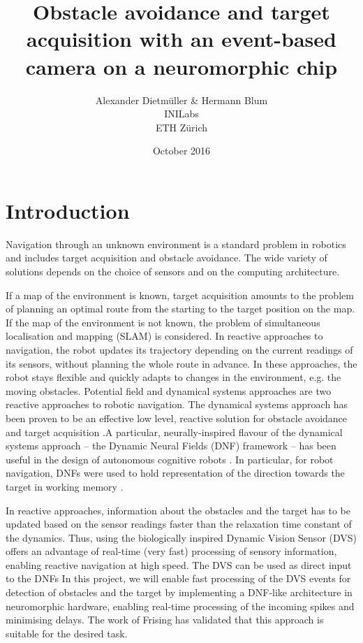 \documentclass[a4paper, twocolumn]{article}
\title{Obstacle avoidance and target acquisition with an event-based camera on a neuromorphic chip}
\author{Alexander Dietmüller \& Hermann Blum \\INILabs\\ETH Zürich}
\date{October 2016}
\begin{document}
\maketitle

\section*{Introduction}
Navigation through an unknown environment is a standard problem in robotics and includes target acquisition and obstacle avoidance. The wide variety of solutions depends on the choice of sensors and on the computing architecture.

If a map of the environment is known, target acquisition amounts to the problem of planning an optimal route from the starting to the target position on the map. If the map of the environment is not known, the problem of simultaneous localisation and mapping (SLAM) is considered.  In reactive approaches to navigation, the robot updates its trajectory depending on the current readings of its sensors, without planning the whole route in advance. In these approaches, the robot stays flexible and quickly adapts to changes in the environment, e.g. the moving obstacles.  Potential field and dynamical systems approaches are two reactive approaches to robotic navigation. The dynamical systems approach has been proven to be an effective low level, reactive solution for obstacle avoidance and target acquisition \cite{bicho1998}.A particular, neurally-inspired flavour of the dynamical systems approach -- the Dynamic Neural Fields (DNF) framework -- has been useful in the design of autonomous cognitive robots \cite{erlhagen2006}. In particular, for robot navigation, DNFs were used to hold representation of the direction towards the target in working memory \cite{bicho2000}.
 
In reactive approaches, information about the obstacles and the target has to be updated based on the sensor readings faster than the relaxation time constant of the dynamics. Thus, using  the biologically inspired Dynamic Vision Sensor (DVS) \cite{lichtsteiner2008} offers an advantage of real-time (very fast) processing of sensory information, enabling reactive navigation at high speed. The DVS can be used as direct input to the DNFs \cite{sandamirskayaconradt2013} In this project, we will enable fast processing of the DVS events for detection of obstacles and the target by implementing a DNF-like architecture in neuromorphic hardware, enabling real-time processing of the incoming spikes and minimising delays. The work of Frising \cite{frising} has validated that this approach is suitable for the desired task.
\end{document}
